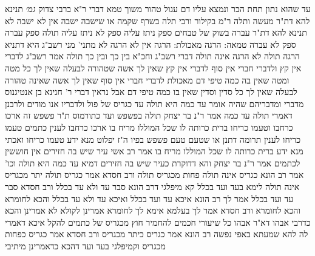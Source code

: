 \documentclass[12pt, openany]{book}
\begin{document}
{עד שהוא נתון תחת הכר ונמצא עליו דם עגול טהור משוך טמא דברי ר"א ברבי צדוק
{\large\emph{גמ׳}} תנינא להא דת"ר מעשה ותלה ר"מ בקילור ורבי תלה בשרף שקמה
או שישבה ישבה אין לא ישבה לא 
תנינא להא דת"ר  עברה בשוק של טבחים ספק ניתז עליה ספק לא ניתז עליה תולה ספק עברה ספק לא עברה טמאה:
הרגה מאכולת: הרגה אין לא הרגה לא מתני' מני  רשב"ג היא דתניא  הרגה תולה לא הרגה אינה תולה דברי רשב"ג  וחכ"א  בין כך ובין כך תולה 
אמר רשב"ג  לדברי אין קץ ולדברי חברי אין סוף 
לדברי אין קץ שאין לך אשה שטהורה לבעלה שאין לך כל מטה ומטה שאין בה כמה טיפי דם מאכולת 
לדברי חברי אין סוף שאין לך אשה שאינה טהורה לבעלה שאין לך כל סדין וסדין שאין בו כמה טיפי דם 
אבל נראין דברי ר' חנינא בן אנטיגנוס מדברי ומדבריהם שהיה אומר  עד כמה היא תולה עד כגריס של פול ולדבריו אנו מודים  ולרבנן דאמרי תולה עד כמה  אמר ר"נ בר יצחק  תולה בפשפש ועד כתורמוס 
ת"ר  פשפש זה ארכו כרחבו וטעמו כריחו ברית כרותה לו שכל המוללו מריח בו  ארכו כרחבו לענין כתמים
טעמו כריחו לענין תרומה  דתנן  או שטעם טעם פשפש בפיו ה"ז יפלוט  מנא ידע  טעמו כריחו  ואכתי מנא ידע  ברית כרותה לו שכל המוללו מריח בו 
אמר רב אשי  עיר שיש בה חזירים אין חוששין לכתמים  אמר ר"נ בר יצחק  והא דדוקרת כעיר שיש בה חזירים דמיא
עד כמה היא תולה וכו' אמר רב הונא  כגריס אינה תולה פחות מכגריס תולה  ורב חסדא אמר  כגריס תולה יתר מכגריס אינה תולה 
לימא בעד ועד בכלל קא מיפלגי דרב הונא סבר  עד ולא עד בכלל ורב חסדא סבר  עד ועד בכלל 
אמר לך רב הונא  איכא עד ועד בכלל ואיכא עד ולא עד בכלל והכא לחומרא והכא לחומרא 
ורב חסדא אמר לך  בעלמא אימא לך לחומרא אמרינן לקולא לא אמרינן  והכא כדרבי אבהו דא"ר אבהו  כל שיעורי חכמים להחמיר חוץ מכגריס של כתמים להקל 
איכא דאמרי לה להא שמעתא באפי נפשה  רב הונא אמר  כגריס כיתר מכגריס ורב חסדא אמר  כגריס כפחות מכגריס וקמיפלגי בעד ועד דהכא כדאמרינן  מיתיבי}
\end{document}
